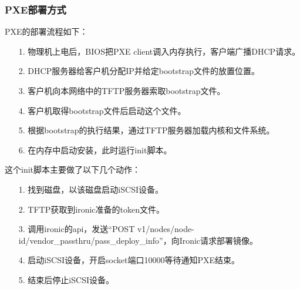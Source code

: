 \documentclass[a4paper,left=2.5cm,right=2.5cm,11pt]{article}
\begin{document}
\subsubsection{PXE部署方式}
	PXE的部署流程如下：
	\begin{itemize}
		\item[1.] 物理机上电后，BIOS把PXE client调入内存执行，客户端广播DHCP请求。
		\item[2.] DHCP服务器给客户机分配IP并给定bootstrap文件的放置位置。
		\item[3.] 客户机向本网络中的TFTP服务器索取bootstrap文件。
		\item[4.] 客户机取得bootstrap文件后启动这个文件。
		\item[5.] 根据bootstrap的执行结果，通过TFTP服务器加载内核和文件系统。
		\item[6.] 在内存中启动安装，此时运行init脚本。
	\end{itemize}

	这个init脚本主要做了以下几个动作：
	\begin{itemize}
		\item[1.] 找到磁盘，以该磁盘启动iSCSI设备。
		\item[2.] TFTP获取到ironic准备的token文件。
		\item[3.] 调用ironic的api，发送“POST v1/nodes/{node-id}/vendor\_passthru/pass\_deploy\_info”，向Ironic请求部署镜像。
		\item[4.] 启动iSCSI设备，开启socket端口10000等待通知PXE结束。
		\item[5.] 结束后停止iSCSI设备。
	\end{itemize}
\end{document}
